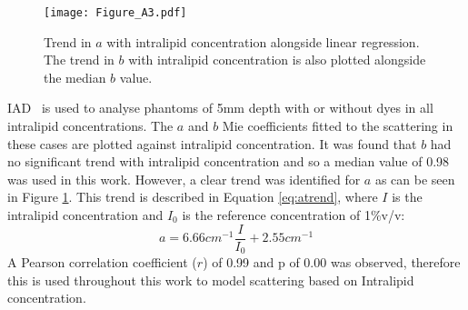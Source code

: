\begin{figure}[h!]
    \centering
    \texttt{[image: Figure\_A3.pdf]}
    \caption{Trend in $a$ with intralipid concentration alongside linear regression. The trend in $b$ with intralipid concentration is also plotted alongside the median $b$ value.}
 \label{fig:atrend}
\end{figure}

IAD~\citep{Prahl2017} is used to analyse phantoms of 5mm depth with or without dyes in all intralipid concentrations. The $a$ and $b$ Mie coefficients fitted to the scattering in these cases are plotted against intralipid concentration. It was found that $b$ had no significant trend with intralipid concentration and so a median value of 0.98 was used in this work.
However, a clear trend was identified for $a$ as can be seen in Figure \ref{fig:atrend}. 
This trend is described in Equation \eqref{eq:atrend}, where $I$ is the intralipid concentration and $I_0$ is the reference concentration of 1\%v/v: 
\begin{equation}
    a = 6.66cm^{-1}\frac{I}{I_0} + 2.55cm^{-1}
    \label{eq:atrend}
\end{equation}
A Pearson correlation coefficient ($r$) of 0.99 and p of 0.00 was observed, therefore this is used throughout this work to model scattering based on Intralipid concentration.

